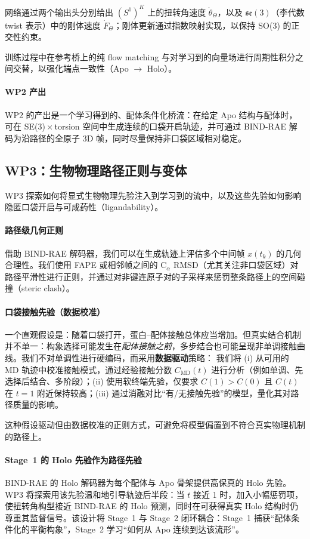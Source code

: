 \documentclass[11pt,a4paper,fontset=fandol]{ctexart}
\begin{document}
网络通过两个输出头分别给出 $(S^1)^K$ 上的扭转角速度 $\dot\theta_\Theta$，以及 $\mathfrak{se}(3)$（李代数 twist 表示）中的刚体速度 $\dot F_\Theta$；刚体更新通过指数映射实现，以保持 SO(3) 的正交性约束。

训练过程中在参考桥上的纯 flow matching 与对学习到的向量场进行周期性积分之间交替，以强化端点一致性（Apo $\to$ Holo）。

\paragraph{WP2 产出}
WP2 的产出是一个学习得到的、配体条件化桥流：在给定 Apo 结构与配体时，可在 SE(3)\,$\times$\,torsion 空间中生成连续的口袋开启轨迹，并可通过 BIND-RAE 解码为沿路径的全原子 3D 帧，同时尽量保持非口袋区域相对稳定。

\subsection{WP3：生物物理路径正则与变体}

WP3 探索如何将显式生物物理先验注入到学习到的流中，以及这些先验如何影响隐匿口袋开启与可成药性（ligandability）。

\paragraph{路径级几何正则}
借助 BIND-RAE 解码器，我们可以在生成轨迹上评估多个中间帧 $x(t_k)$ 的几何合理性。我们使用 FAPE 或相邻帧之间的 C$_\alpha$ RMSD（尤其关注非口袋区域）对路径平滑性进行正则，并通过对非键连原子对的子采样来惩罚整条路径上的空间碰撞（steric clash）。

\paragraph{口袋接触先验（数据校准）}
一个直观假设是：随着口袋打开，蛋白--配体接触总体应当增加。但真实结合机制并不单一：构象选择可能发生在\emph{配体接触之前}，多步结合也可能呈现非单调接触曲线。我们不对单调性进行硬编码，而采用\textbf{数据驱动}策略：
我们将 (i) 从可用的 MD 轨迹中校准接触模式，通过经验接触分数 $C_{\text{MD}}(t)$ 进行分析（例如单调、先选择后结合、多阶段）；(ii) 使用软终端先验，仅要求 $C(1) > C(0)$ 且 $C(t)$ 在 $t=1$ 附近保持较高；(iii) 通过消融对比“有/无接触先验”的模型，量化其对路径质量的影响。

这种假设驱动但由数据校准的正则方式，可避免将模型偏置到不符合真实物理机制的路径上。

\paragraph{Stage~1 的 Holo 先验作为路径先验}
BIND-RAE 的 Holo 解码器为每个配体与 Apo 骨架提供高保真的 Holo 先验。WP3 将探索用该先验温和地引导轨迹后半段：当 $t$ 接近 1 时，加入小幅惩罚项，使扭转角构型接近 BIND-RAE 的 Holo 预测，同时在可获得真实 Holo 结构时仍尊重其监督信号。该设计将 Stage~1 与 Stage~2 闭环耦合：Stage~1 捕获“配体条件化的平衡构象”，Stage~2 学习“如何从 Apo 连续到达该流形”。
\end{document}
